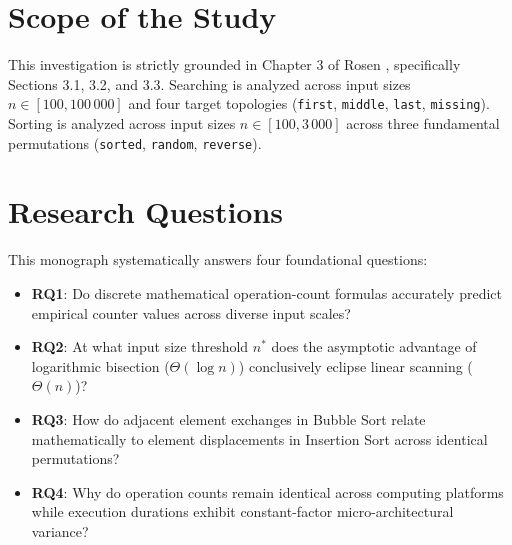 \section{Scope of the Study}
This investigation is strictly grounded in Chapter 3 of Rosen \cite{rosen2019discrete}, specifically Sections 3.1, 3.2, and 3.3. Searching is analyzed across input sizes $n \in [100, 100\,000]$ and four target topologies (\texttt{first}, \texttt{middle}, \texttt{last}, \texttt{missing}). Sorting is analyzed across input sizes $n \in [100, 3\,000]$ across three fundamental permutations (\texttt{sorted}, \texttt{random}, \texttt{reverse}).

\section{Research Questions}
This monograph systematically answers four foundational questions:
\begin{itemize}
    \item \textbf{RQ1}: Do discrete mathematical operation-count formulas accurately predict empirical counter values across diverse input scales?
    \item \textbf{RQ2}: At what input size threshold $n^*$ does the asymptotic advantage of logarithmic bisection ($\Theta(\log n)$) conclusively eclipse linear scanning ($\Theta(n)$)?
    \item \textbf{RQ3}: How do adjacent element exchanges in Bubble Sort relate mathematically to element displacements in Insertion Sort across identical permutations?
    \item \textbf{RQ4}: Why do operation counts remain identical across computing platforms while execution durations exhibit constant-factor micro-architectural variance?
\end{itemize}

